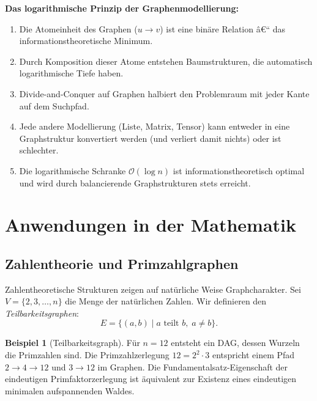 ﻿\documentclass[12pt,a4paper,twoside]{article}
\theoremstyle{definition}
\newtheorem{beispiel}{Beispiel}[section]
\theoremstyle{plain}
\theoremstyle{remark}
\begin{document}
\textbf{Das logarithmische Prinzip der Graphenmodellierung:}
\begin{enumerate}
  \item Die Atomeinheit des Graphen ($u \to v$) ist eine binäre
        Relation â€“ das informationstheoretische Minimum.
  \item Durch Komposition dieser Atome entstehen Baumstrukturen,
        die automatisch logarithmische Tiefe haben.
  \item Divide-and-Conquer auf Graphen halbiert den Problemraum
        mit jeder Kante auf dem Suchpfad.
  \item Jede andere Modellierung (Liste, Matrix, Tensor) kann
        entweder in eine Graphstruktur konvertiert werden
        (und verliert damit nichts) oder ist schlechter.
  \item Die logarithmische Schranke $\mathcal{O}(\log n)$
        ist informationstheoretisch optimal und wird durch
        balancierende Graphstrukturen stets erreicht.
\end{enumerate}

\section{Anwendungen in der Mathematik}
\label{sec:math}

\subsection{Zahlentheorie und Primzahlgraphen}

Zahlentheoretische Strukturen zeigen auf natürliche Weise
Graphcharakter. Sei $V = \{2, 3, \ldots, n\}$ die Menge der
natürlichen Zahlen.  Wir definieren den \emph{Teilbarkeitsgraphen}:
\[
  E = \{(a,b) \mid a \text{ teilt } b,\; a \neq b\}.
\]

\begin{beispiel}[Teilbarkeitsgraph]
Für $n=12$ entsteht ein DAG, dessen Wurzeln die Primzahlen sind.
Die Primzahlzerlegung $12 = 2^2 \cdot 3$ entspricht einem Pfad
$2 \to 4 \to 12$ und $3 \to 12$ im Graphen.  Die
Fundamentalsatz-Eigenschaft der eindeutigen Primfaktorzerlegung
ist äquivalent zur Existenz eines eindeutigen minimalen
aufspannenden Waldes.
\end{beispiel}
\end{document}
